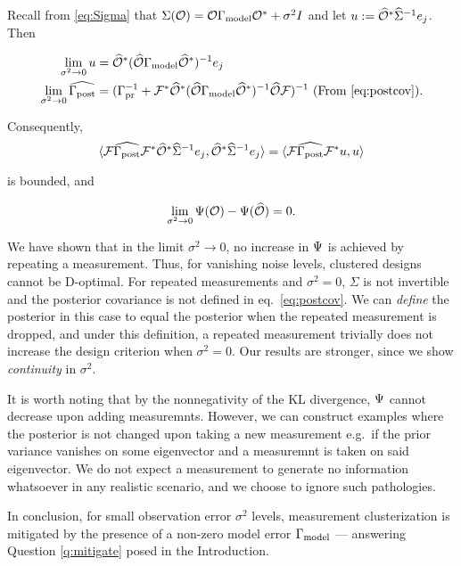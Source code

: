 Recall from \eqref{eq:Sigma} that $\Sigma(\mathcal{O}) = \mathcal{O}
\Gamma_{\textup{model}} \mathcal{O}^* + \sigma^2I$ and let $u := \widehat{\mathcal{O}}^*
\widehat{\Sigma}^{-1}e_j$. Then

\begin{align*}
  \begin{split}
    \lim_{\sigma^2 \to 0} u &= \obsm^*(\obsm \modcov \obsm^*)^{-1}e_j\\
    \lim_{\sigma^2 \to 0} \postcovm &= (\prcov^{-1} + \fwd^* \obsm^* (\obsm \modcov \obsm^*)^{-1} \obsm \fwd)^{-1} \text{ (From \eqref{eq:postcov})}.
  \end{split}
\end{align*}

Consequently, 
\begin{equation*}
   \langle \fwd \postcovm \fwd^* \obsm^* \Sigmam^{-1}
    e_j, \obsm^* \Sigmam^{-1}e_j \rangle 
  = \langle \fwd \postcovm \fwd^* u, u \rangle
\end{equation*}

is bounded, and

\begin{equation*}
\lim_{\sigma^2 \to 0} \tar(\obs) -\tar(\obsm) = 0.
\end{equation*}

We have shown that in the limit $\sigma^2 \to 0$, no increase in
$\Psi$ is achieved by repeating a measurement. Thus, for vanishing
noise levels, clustered designs cannot be D-optimal. For repeated
measurements and $\sigma^2=0$, $\Sigma$ is not invertible and the
posterior covariance is not defined in eq.~\eqref{eq:postcov}. We can
\emph{define} the posterior in this case to equal the posterior when
the repeated measurement is dropped, and under this definition, a
repeated measurement trivially does not increase the design criterion
when $\sigma^2=0$. Our results are stronger, since we show
\emph{continuity} in $\sigma^2$.

It is worth noting that by the nonnegativity of the KL divergence,
$\Psi$ cannot decrease upon adding measuremnts. However, we can
construct examples where the posterior is not changed upon taking a
new measurement e.g.~if the prior variance vanishes on some
eigenvector and a measuremnt is taken on said eigenvector. We do not
expect a measurement to generate no information whatsoever in any
realistic scenario, and we choose to ignore such pathologies.

In conclusion, for small observation error $\sigma^2$ levels,
measurement clusterization is mitigated by the presence of a non-zero
model error $\Gamma_{\textup{model}}$ --- answering Question \ref{q:mitigate} posed in
the Introduction.%
